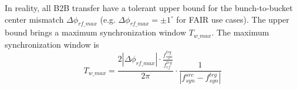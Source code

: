 
In reality, all B2B transfer have a tolerant upper bound for the bunch-to-bucket center mismatch $\Delta \phi_\mathit{rf\_max}$ (e.g. $\Delta \phi_\mathit{rf\_max}=\pm1^\circ$ for FAIR use cases). The upper bound brings a maximum synchronization window $T_{w\_max}$. The maximum synchronization window is 
\begin{equation}
T_{w\_max}=\frac{2|\Delta \phi_\mathit{rf\_max}|\cdot\frac{f_\mathit{syn}^\mathit{trg}}{f_\mathit{rf}^\mathit{trg}}}{2\pi}\cdot\frac{1}{|f_{\mathit{syn}}^\mathit{src}-f_{\mathit{syn}}^\mathit{trg}|}
\end{equation}




%
%
%
%

